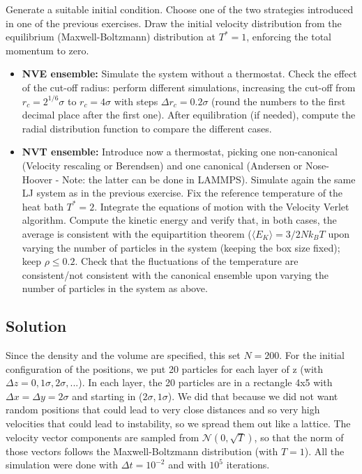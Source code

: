\documentclass[../main.tex]{subfiles}
\begin{document}
Generate a suitable initial condition. Choose one of the two strategies introduced in one of the previous exercises. Draw the initial velocity distribution from the equilibrium (Maxwell-Boltzmann) distribution at $T^* = 1$, enforcing the total momentum to zero.

\begin{itemize}
    \item \textbf{NVE ensemble:} Simulate the system without a thermostat. Check the effect of the cut-off radius: perform different simulations, increasing the cut-off from $r_c = 2^{1/6}\sigma$ to $r_c = 4\sigma$ with steps $\Delta r_c = 0.2\sigma$ (round the numbers to the first decimal place after the first one). After equilibration (if needed), compute the radial distribution function to compare the different cases.
    \item \textbf{NVT ensemble:} Introduce now a thermostat, picking one non-canonical (Velocity rescaling or Berendsen) and one canonical (Andersen or Nose-Hoover - Note: the latter can be done in LAMMPS). Simulate again the same LJ system as in the previous exercise. Fix the reference temperature of the heat bath $T^* = 2$. Integrate the equations of motion with the Velocity Verlet algorithm. Compute the kinetic energy and verify that, in both cases, the average is consistent with the equipartition theorem ($\langle E_K \rangle = 3/2 N k_B T$ upon varying the number of particles in the system (keeping the box size fixed); keep $\rho \leq 0.2$. Check that the fluctuations of the temperature are consistent/not consistent with the canonical ensemble upon varying the number of particles in the system as above.
\end{itemize}

\subsection{Solution}

Since the density and the volume are specified, this set $N=200$. For the initial configuration of the positions, we put 20 particles for each layer of z (with $\Delta z = 0,1\sigma,2\sigma,...$). In each layer, the 20 particles are in a rectangle 4x5 with $\Delta x = \Delta y = 2\sigma$ and starting in ($2\sigma, 1\sigma$). We did that because we did not want random positions that could lead to very close distances and so very high velocities that could lead to instability, so we spread them out like a lattice. The velocity vector components are sampled from $\mathcal{N}(0, \sqrt{T})$, so that the norm of those vectors follows the Maxwell-Boltzmann distribution (with $T=1$). All the simulation were done with $\Delta t = 10^{-2}$ and with $10^5$ iterations.
\end{document}
